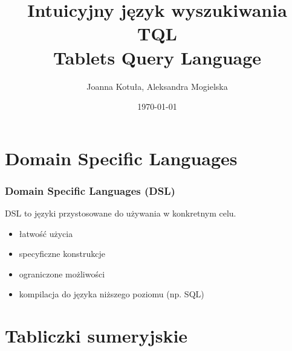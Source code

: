\documentclass[xcolor=dvipsnames,10pt]{beamer}
\author{Joanna Kotuła, Aleksandra Mogielska}
\institute[...]{Wydział Matematyki, Informatyki i Mechaniki\\
Uniwersytet Warszawski}
\title[Intuicyjny język wyszukiwania TQL (Tablets Query Language)]{\bf  Intuicyjny język wyszukiwania TQL \\
Tablets Query Language}
\date{\today}
\begin{document}
\begin{frame}
     \titlepage
\end{frame}




\section{Domain Specific Languages}


\begin{frame}
     \frametitle{Domain Specific Languages (DSL)}
     
     DSL to języki przystosowane do używania w konkretnym celu.
     \begin{itemize}
          \item
          łatwość użycia
          \item
          specyficzne konstrukcje
          \item 
          ograniczone możliwości
          \item
          kompilacja do języka niższego poziomu (np. SQL)
     \end{itemize}


\end{frame}

\section{Tabliczki sumeryjskie}
\end{document}
